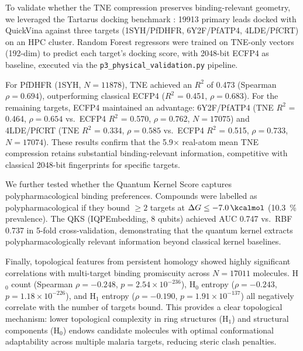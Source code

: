 \documentclass[11pt,a4paper]{article}
\begin{document}
To validate whether the TNE compression preserves binding-relevant geometry, we leveraged the Tartarus docking benchmark \citep{tartarus_2024}: \num{19913} primary leads docked with QuickVina against three targets (1SYH/PfDHFR, 6Y2F/PfATP4, 4LDE/PfCRT) on an HPC cluster. Random Forest regressors were trained on TNE-only vectors (\num{192}-dim) to predict each target's docking score, with \num{2048}-bit ECFP4 as baseline, executed via the \texttt{p3\_physical\_validation.py} pipeline.

For PfDHFR (1SYH, $N = \num{11878}$), TNE achieved an $R^2$ of \num{0.473} (Spearman $\rho = \num{0.694}$), outperforming classical ECFP4 ($R^2$ = \num{0.451}, $\rho = \num{0.683}$). For the remaining targets, ECFP4 maintained an advantage: 6Y2F/PfATP4 (TNE $R^2$ = \num{0.464}, $\rho = \num{0.654}$ vs.\ ECFP4 $R^2$ = \num{0.570}, $\rho = \num{0.762}$, $N = \num{17075}$) and 4LDE/PfCRT (TNE $R^2$ = \num{0.334}, $\rho = \num{0.585}$ vs.\ ECFP4 $R^2$ = \num{0.515}, $\rho = \num{0.733}$, $N = \num{17074}$). These results confirm that the \num{5.9}$\times$ real-atom mean TNE compression retains substantial binding-relevant information, competitive with classical \num{2048}-bit fingerprints for specific targets.

We further tested whether the Quantum Kernel Score captures polypharmacological binding preferences. Compounds were labelled as polypharmacological if they bound $\geq 2$ targets at $\Delta G \leq -\SI{7.0}{\kcalmol}$ (\qty{10.3}{\percent} prevalence). The QKS (IQPEmbedding, 8 qubits) achieved AUC \num{0.747} vs.\ RBF \num{0.737} in \num{5}-fold cross-validation, demonstrating that the quantum kernel extracts polypharmacologically relevant information beyond classical kernel baselines.

Finally, topological features from persistent homology showed highly significant correlations with multi-target binding promiscuity across $N = \num{17011}$ molecules. H$_0$ count (Spearman $\rho = -\num{0.248}$, $p = 2.54 \times 10^{-236}$), H$_0$ entropy ($\rho = -\num{0.243}$, $p = 1.18 \times 10^{-226}$), and H$_1$ entropy ($\rho = -\num{0.190}$, $p = 1.91 \times 10^{-137}$) all negatively correlate with the number of targets bound. This provides a clear topological mechanism: lower topological complexity in ring structures (H$_1$) and structural components (H$_0$) endows candidate molecules with optimal conformational adaptability across multiple malaria targets, reducing steric clash penalties.

\end{document}
